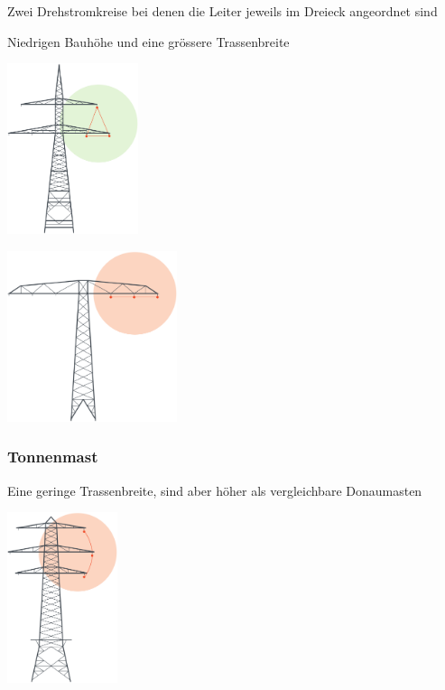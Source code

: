 \begin{minipage}[c]{0.4\columnwidth}
    Zwei Drehstromkreise bei denen die Leiter jeweils im Dreieck angeordnet sind
\end{minipage}
\hfill
\begin{minipage}[c]{0.56\columnwidth}
    Niedrigen Bauhöhe und eine grössere Trassenbreite
\end{minipage}

\begin{minipage}[c]{0.4\columnwidth}
    \begin{center}
        \includegraphics[height=5cm, align=c]{images/Mastenformen_1.png}
    \end{center}
\end{minipage}
\hfill
\begin{minipage}[c]{0.56\columnwidth}
    \begin{center}
        \includegraphics[height=5cm, align=c]{images/Mastenformen_2.png}
    \end{center}
\end{minipage}

\begin{minipage}[c]{0.5\columnwidth}
    \subsubsection{Tonnenmast}
    Eine geringe Trassenbreite, sind aber höher als vergleichbare Donaumasten

    \includegraphics[height=5cm, align=c]{images/Mastenformen_3.png}    
\end{minipage}



